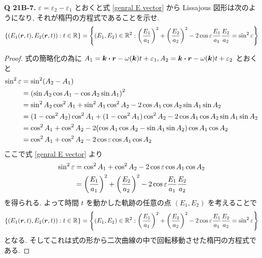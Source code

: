 \documentclass[uplatex,a4paper,dvipdfmx]{jsarticle}
\theoremstyle{definition}
\begin{document}
\textbf{Q 21B-7.} $\varepsilon = \varepsilon_2 - \varepsilon_1$ とおくと式 \eqref{genral E vector} から Lissajous 図形は次のようになり, それが楕円の方程式であることを示せ.
\begin{align}
  \qty{(E_1(\vb*{r}, t), E_2(\vb*{r}, t)):t\in\mathbb{R}} = \qty{(E_1, E_2)\in\mathbb{R}^2:\qty(\frac{E_1}{a_1})^2 + \qty(\frac{E_2}{a_2})^2 - 2\cos\varepsilon\frac{E_1}{a_1}\frac{E_2}{a_2} = \sin^2{\varepsilon}}
\end{align}
\begin{proof}
  式の簡略化の為に $A_1 = \kk\vdot\rr - \omega(\kk)t + \varepsilon_1, A_2 = \kk\vdot\rr - \omega(\kk)t + \varepsilon_2$ とおくと
  \begin{align}
    \sin^2\varepsilon & = \sin^2(A_2 - A_1)                                                                                   \\
                      & = \qty(\sin{A_2}\cos{A_1} - \cos{A_2}\sin{A_1})^2                                                     \\
                      & = \sin^2{A_2}\cos^2{A_1} + \sin^2{A_1}\cos^2{A_2} - 2\cos{A_1}\cos{A_2}\sin{A_1}\sin{A_2}             \\
                      & = (1 - \cos^2{A_2})\cos^2{A_1} + (1 - \cos^2{A_1})\cos^2{A_2} - 2\cos{A_1}\cos{A_2}\sin{A_1}\sin{A_2} \\
                      & = \cos^2{A_1} + \cos^2{A_2} - 2\qty(\cos{A_1}\cos{A_2} - \sin{A_1}\sin{A_2})\cos{A_1}\cos{A_2}        \\
                      & = \cos^2{A_1} + \cos^2{A_2} - 2\cos\varepsilon\cos{A_1}\cos{A_2}
  \end{align}
  ここで式 \eqref{genral E vector} より
  \begin{align}
    \sin^2\varepsilon & = \cos^2{A_1} + \cos^2{A_2} - 2\cos\varepsilon\cos{A_1}\cos{A_2}                                     \\
                      & = \qty(\frac{E_1}{a_1})^2 + \qty(\frac{E_2}{a_2})^2 - 2\cos\varepsilon\frac{E_1}{a_1}\frac{E_2}{a_2}
  \end{align}
  を得られる. よって時間 $t$ を動かした軌跡の任意の点 $(E_1, E_2)$ を考えることで
  \begin{align}
    \qty{(E_1(\vb*{r}, t), E_2(\vb*{r}, t)):t\in\mathbb{R}} = \qty{(E_1, E_2)\in\mathbb{R}^2:\qty(\frac{E_1}{a_1})^2 + \qty(\frac{E_2}{a_2})^2 - 2\cos\varepsilon\frac{E_1}{a_1}\frac{E_2}{a_2} = \sin^2{\varepsilon}}
  \end{align}
  となる. そしてこれは式の形から二次曲線の中で回転移動させた楕円の方程式である.
\end{proof}
\end{document}
